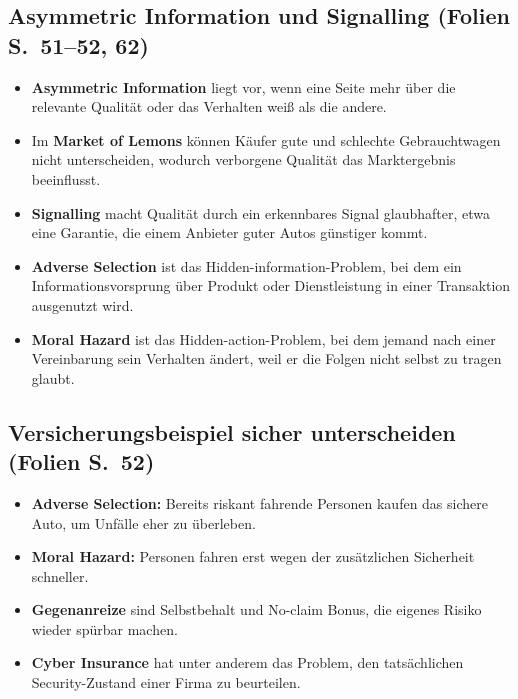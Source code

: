 \documentclass[11pt,a4paper]{article}
\newcommand{\block}[2]{\subsection*{#1 {\normalfont\small (Folien S.~#2)}}}
\begin{document}
\block{Asymmetric Information und Signalling}{51--52, 62}
\begin{itemize}
\item \textbf{Asymmetric Information} liegt vor, wenn eine Seite mehr über die relevante Qualität oder das Verhalten weiß als die andere.
\item Im \textbf{Market of Lemons} können Käufer gute und schlechte Gebrauchtwagen nicht unterscheiden, wodurch verborgene Qualität das Marktergebnis beeinflusst.
\item \textbf{Signalling} macht Qualität durch ein erkennbares Signal glaubhafter, etwa eine Garantie, die einem Anbieter guter Autos günstiger kommt.
\item \textbf{Adverse Selection} ist das Hidden-information-Problem, bei dem ein Informationsvorsprung über Produkt oder Dienstleistung in einer Transaktion ausgenutzt wird.
\item \textbf{Moral Hazard} ist das Hidden-action-Problem, bei dem jemand nach einer Vereinbarung sein Verhalten ändert, weil er die Folgen nicht selbst zu tragen glaubt.
\end{itemize}
\block{Versicherungsbeispiel sicher unterscheiden}{52}
\begin{itemize}
\item \textbf{Adverse Selection:} Bereits riskant fahrende Personen kaufen das sichere Auto, um Unfälle eher zu überleben.
\item \textbf{Moral Hazard:} Personen fahren erst wegen der zusätzlichen Sicherheit schneller.
\item \textbf{Gegenanreize} sind Selbstbehalt und No-claim Bonus, die eigenes Risiko wieder spürbar machen.
\item \textbf{Cyber Insurance} hat unter anderem das Problem, den tatsächlichen Security-Zustand einer Firma zu beurteilen.
\end{itemize}

\newpage
\end{document}

